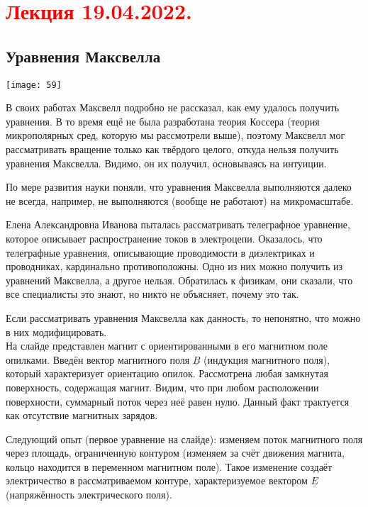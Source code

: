 \documentclass[main.tex]{subfiles}
\begin{document}
\section{\textcolor{red}{Лекция 19.04.2022.}}

\subsection{Уравнения Максвелла}
\texttt{[image: 59]}

В своих работах Максвелл подробно не рассказал, как ему удалось получить уравнения. В то время ещё не была разработана теория Коссера (теория микрополярных сред, которую мы рассмотрели выше), поэтому Максвелл мог рассматривать вращение только как твёрдого целого, откуда нельзя получить уравнения Максвелла. Видимо, он их получил, основываясь на интуиции.

По мере развития науки поняли, что уравнения Максвелла выполняются далеко не всегда, например, не выполняются (вообще не работают) на микромасштабе.

Елена Александровна Иванова пыталась рассматривать телеграфное уравнение, которое описывает распространение токов в электроцепи. Оказалось, что телеграфные уравнения, описывающие проводимости в диэлектриках и проводниках, кардинально противоположны. Одно из них можно получить из уравнений Максвелла, а другое нельзя. Обратилась к физикам, они сказали, что все специалисты это знают, но никто не объясняет, почему это так.

Если рассматривать уравнения Максвелла как данность, то непонятно, что можно в них модифицировать.\\

На слайде представлен магнит с ориентированными в его магнитном поле опилками. Введён вектор магнитного поля $\underline{B}$ (индукция магнитного поля), который характеризует ориентацию опилок. Рассмотрена любая замкнутая поверхность, содержащая магнит. Видим, что при любом расположении поверхности, суммарный поток через неё равен нулю. Данный факт трактуется как отсутствие магнитных зарядов.


Следующий опыт (первое уравнение на слайде): изменяем поток магнитного поля через площадь, ограниченную контуром (изменяем за счёт движения магнита, кольцо находится в переменном магнитном поле). Такое изменение создаёт электричество в рассматриваемом контуре, характеризуемое вектором $\underline{E}$ (напряжённость электрического поля).
\end{document}
